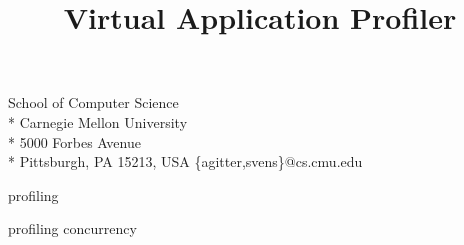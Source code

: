 \documentclass[natbib,10pt,preprint]{sigplanconf}
\begin{document}
\conferenceinfo{ }
\CopyrightYear{ }
\copyrightdata{ }



\title{Virtual Application Profiler}



           {School of Computer Science \\* Carnegie Mellon University  \\* 5000 Forbes Avenue \\* Pittsburgh, PA 15213, USA}
           {\{agitter,svens\}@cs.cmu.edu}


\maketitle




\terms
profiling

\keywords
profiling concurrency






















\end{document}
